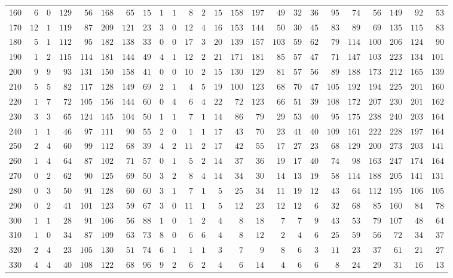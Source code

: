 \begin{sidewaystable}[!tbp]
\begin{center}
\begin{tabular}{lrrrrrrrrrrrrrrrrrrrrrrr}
160&$ 6$&$0$&$129$&$ 56$&$168$&$ 65$&$ 15$&$1$&$1$&$ 8$&$ 2$&$15$&$158$&$197$&$ 49$&$32$&$36$&$ 95$&$ 74$&$ 56$&$149$&$ 92$&$ 53$\tabularnewline
170&$12$&$1$&$119$&$ 87$&$209$&$121$&$ 23$&$3$&$0$&$12$&$ 4$&$16$&$153$&$144$&$ 50$&$30$&$45$&$ 83$&$ 89$&$ 69$&$135$&$115$&$ 83$\tabularnewline
180&$ 5$&$1$&$112$&$ 95$&$182$&$138$&$ 33$&$0$&$0$&$17$&$ 3$&$20$&$139$&$157$&$103$&$59$&$62$&$ 79$&$114$&$100$&$206$&$124$&$ 90$\tabularnewline
190&$ 1$&$2$&$115$&$114$&$181$&$144$&$ 49$&$4$&$1$&$12$&$ 2$&$21$&$171$&$181$&$ 85$&$57$&$47$&$ 71$&$147$&$103$&$223$&$134$&$101$\tabularnewline
200&$ 9$&$9$&$ 93$&$131$&$150$&$158$&$ 41$&$0$&$0$&$10$&$ 2$&$15$&$130$&$129$&$ 81$&$57$&$56$&$ 89$&$188$&$173$&$212$&$165$&$139$\tabularnewline
210&$ 5$&$5$&$ 82$&$117$&$128$&$149$&$ 69$&$2$&$1$&$ 4$&$ 5$&$19$&$100$&$123$&$ 68$&$70$&$47$&$105$&$192$&$194$&$225$&$201$&$160$\tabularnewline
220&$ 1$&$7$&$ 72$&$105$&$156$&$144$&$ 60$&$0$&$4$&$ 6$&$ 4$&$22$&$ 72$&$123$&$ 66$&$51$&$39$&$108$&$172$&$207$&$230$&$201$&$162$\tabularnewline
230&$ 3$&$3$&$ 65$&$124$&$145$&$104$&$ 50$&$1$&$1$&$ 7$&$ 1$&$14$&$ 86$&$ 79$&$ 29$&$53$&$40$&$ 95$&$175$&$238$&$240$&$203$&$164$\tabularnewline
240&$ 1$&$1$&$ 46$&$ 97$&$111$&$ 90$&$ 55$&$2$&$0$&$ 1$&$ 1$&$17$&$ 43$&$ 70$&$ 23$&$41$&$40$&$109$&$161$&$222$&$228$&$197$&$164$\tabularnewline
250&$ 2$&$4$&$ 60$&$ 99$&$112$&$ 68$&$ 39$&$4$&$2$&$11$&$ 2$&$17$&$ 42$&$ 55$&$ 17$&$27$&$23$&$ 68$&$129$&$200$&$273$&$203$&$141$\tabularnewline
260&$ 1$&$4$&$ 64$&$ 87$&$102$&$ 71$&$ 57$&$0$&$1$&$ 5$&$ 2$&$14$&$ 37$&$ 36$&$ 19$&$17$&$40$&$ 74$&$ 98$&$163$&$247$&$174$&$164$\tabularnewline
270&$ 0$&$2$&$ 62$&$ 90$&$125$&$ 69$&$ 50$&$3$&$2$&$ 8$&$ 4$&$14$&$ 34$&$ 30$&$ 14$&$13$&$19$&$ 58$&$114$&$188$&$205$&$141$&$131$\tabularnewline
280&$ 0$&$3$&$ 50$&$ 91$&$128$&$ 60$&$ 60$&$3$&$1$&$ 7$&$ 1$&$ 5$&$ 25$&$ 34$&$ 11$&$19$&$12$&$ 43$&$ 64$&$112$&$195$&$106$&$105$\tabularnewline
290&$ 0$&$2$&$ 41$&$101$&$123$&$ 59$&$ 67$&$3$&$0$&$11$&$ 1$&$ 5$&$ 12$&$ 23$&$ 12$&$12$&$ 6$&$ 32$&$ 68$&$ 85$&$160$&$ 84$&$ 78$\tabularnewline
300&$ 1$&$1$&$ 28$&$ 91$&$106$&$ 56$&$ 88$&$1$&$0$&$ 1$&$ 2$&$ 4$&$  8$&$ 18$&$  7$&$ 7$&$ 9$&$ 43$&$ 53$&$ 79$&$107$&$ 48$&$ 64$\tabularnewline
310&$ 1$&$0$&$ 34$&$ 87$&$109$&$ 63$&$ 73$&$8$&$0$&$ 6$&$ 6$&$ 4$&$  8$&$ 12$&$  2$&$ 4$&$ 6$&$ 25$&$ 59$&$ 56$&$ 72$&$ 34$&$ 37$\tabularnewline
320&$ 2$&$4$&$ 23$&$105$&$130$&$ 51$&$ 74$&$6$&$1$&$ 1$&$ 1$&$ 3$&$  7$&$  9$&$  8$&$ 6$&$ 3$&$ 11$&$ 23$&$ 37$&$ 61$&$ 21$&$ 27$\tabularnewline
330&$ 4$&$4$&$ 40$&$108$&$122$&$ 68$&$ 96$&$9$&$2$&$ 6$&$ 2$&$ 4$&$  6$&$ 14$&$  4$&$ 6$&$ 6$&$  8$&$ 24$&$ 29$&$ 31$&$ 16$&$ 13$\tabularnewline

\end{tabular}
\end{center}
\end{sidewaystable}
